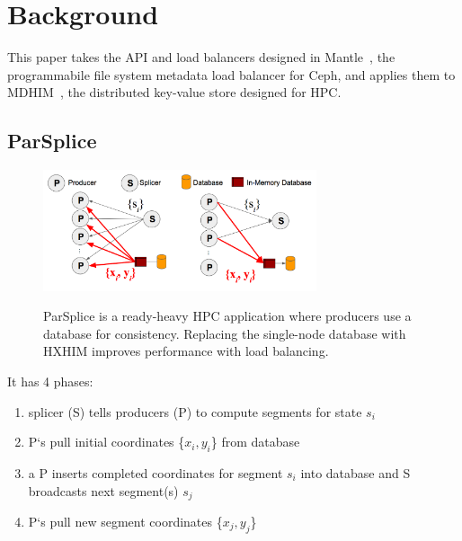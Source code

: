 \section{Background}

This paper takes the API and load balancers designed in
Mantle~\cite{sevilla:sc15-mantle}, the programmabile file system metadata load
balancer for Ceph, and applies them to
MDHIM~\cite{greenberg:hotstorage2015-mdhim}, the distributed key-value store
designed for HPC.

\subsection{ParSplice}
\label{sec:parsplice}

\begin{figure}[t]
  \noindent\includegraphics[width=19pc,angle=0]{figures/arch-parsplice.png}\\
  \caption{ParSplice is a ready-heavy HPC application where producers use a
  database for consistency. Replacing the single-node database with HXHIM
  improves performance with load balancing.
  \label{fig:arch-parsplice}}
\end{figure}

It has 4 phases:

\begin{enumerate}

  \item splicer (S) tells producers (P) to compute segments for state \(s_i\)

  \item P`s pull initial coordinates \{\(x_i, y_i\)\} from database

  \item a P inserts completed coordinates for segment \(s_i\) into database and
  S broadcasts next segment(s) \(s_j\) 

  \item P`s pull new segment coordinates \{\(x_j, y_j\)\}
\end{enumerate}



